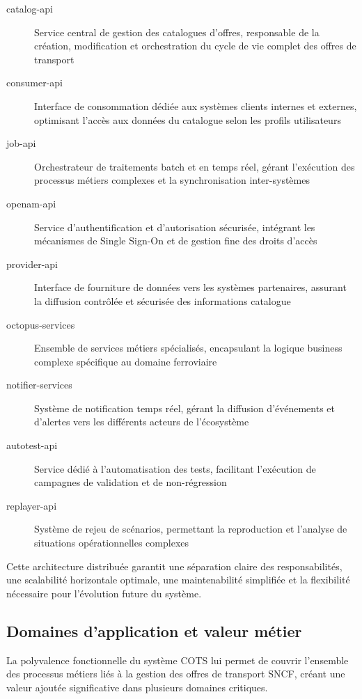 \begin{description}
    \item[catalog-api] Service central de gestion des catalogues d'offres, responsable de la création, modification et orchestration du cycle de vie complet des offres de transport
    \item[consumer-api] Interface de consommation dédiée aux systèmes clients internes et externes, optimisant l'accès aux données du catalogue selon les profils utilisateurs
    \item[job-api] Orchestrateur de traitements batch et en temps réel, gérant l'exécution des processus métiers complexes et la synchronisation inter-systèmes
    \item[openam-api] Service d'authentification et d'autorisation sécurisée, intégrant les mécanismes de Single Sign-On et de gestion fine des droits d'accès
    \item[provider-api] Interface de fourniture de données vers les systèmes partenaires, assurant la diffusion contrôlée et sécurisée des informations catalogue
    \item[octopus-services] Ensemble de services métiers spécialisés, encapsulant la logique business complexe spécifique au domaine ferroviaire
    \item[notifier-services] Système de notification temps réel, gérant la diffusion d'événements et d'alertes vers les différents acteurs de l'écosystème
    \item[autotest-api] Service dédié à l'automatisation des tests, facilitant l'exécution de campagnes de validation et de non-régression
    \item[replayer-api] Système de rejeu de scénarios, permettant la reproduction et l'analyse de situations opérationnelles complexes
\end{description}

Cette architecture distribuée garantit une séparation claire des responsabilités, une scalabilité horizontale optimale, une maintenabilité simplifiée et la flexibilité nécessaire pour l'évolution future du système.

\subsection{Domaines d'application et valeur métier}

La polyvalence fonctionnelle du système COTS lui permet de couvrir l'ensemble des processus métiers liés à la gestion des offres de transport SNCF, créant une valeur ajoutée significative dans plusieurs domaines critiques.


